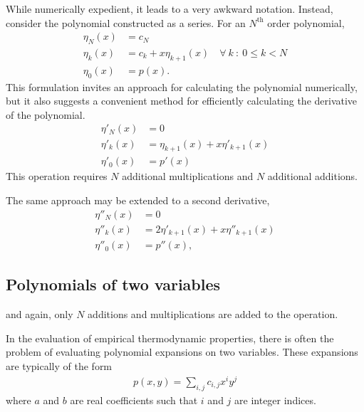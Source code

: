 \documentclass[letterpaper,11pt]{article}
\begin{document}
While numerically expedient, it leads to a very awkward notation.  Instead, consider the polynomial constructed as a series.  For an $N^\mathrm{th}$ order polynomial,
\begin{subequations}
\begin{align}
\eta_N(x) &= c_N\\
\eta_k(x) &= c_k + x\eta_{k+1}(x) \hspace{1em} \forall\ k\ :\ 0 \le k < N\\
\eta_0(x) &= p(x).
\end{align}
\end{subequations}
This formulation invites an approach for calculating the polynomial numerically, but it also suggests a convenient method for efficiently calculating the derivative of the polynomial.
\begin{subequations}
\begin{align}
\eta'_N(x) &= 0\\
\eta'_k(x) &= \eta_{k+1}(x) + x\eta'_{k+1}(x)\\
\eta'_0(x) &= p'(x)
\end{align}
\end{subequations}
This operation requires $N$ additional multiplications and $N$ additional additions.

The same approach may be extended to a second derivative,
\begin{subequations}
\begin{align}
\eta''_N(x) &= 0\\
\eta''_k(x) &= 2\eta'_{k+1}(x) + x\eta''_{k+1}(x)\\
\eta''_0(x) &= p''(x),
\end{align}
\end{subequations}
\subsection{Polynomials of two variables}
and again, only $N$ additions and multiplications are added to the operation.

In the evaluation of empirical thermodynamic properties, there is often the problem of evaluating polynomial expansions on two variables.  These expansions are typically of the form
\begin{align}
p(x,y) = \sum_{i,j} c_{i,j} x^i y^j\label{eqn:general}
\end{align}
where $a$ and $b$ are real coefficients such that $i$ and $j$ are integer indices.
\end{document}
